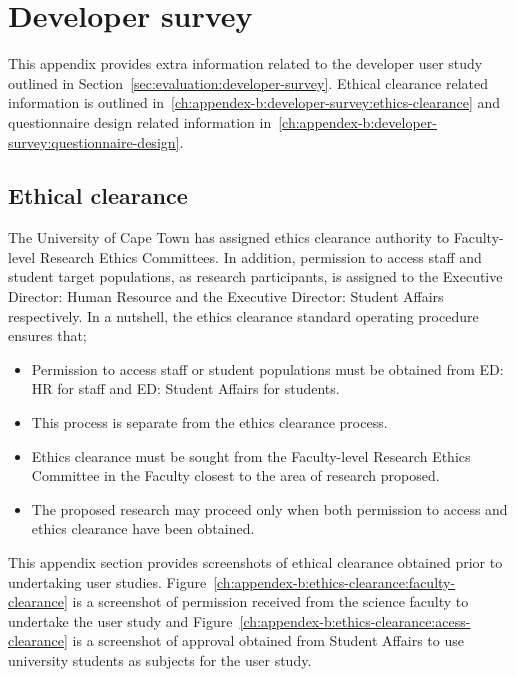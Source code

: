 \chapter[Developer survey]{Developer survey\label{ch:appendex-b:developer-survey}}

This appendix provides extra information related to the developer user study outlined in Section~\ref{sec:evaluation:developer-survey}. Ethical clearance related information is outlined in~\ref{ch:appendex-b:developer-survey:ethics-clearance} and questionnaire design related information in~\ref{ch:appendex-b:developer-survey:questionnaire-design}.

\section[Ethical clearance]{Ethical clearance \label{ch:appendex-b:developer-survey:ethics-clearance}}

The University of Cape Town has assigned ethics clearance authority to Faculty-level Research Ethics Committees. In addition, permission to access staff and student target populations, as research participants, is assigned to the Executive Director: Human Resource and the Executive Director: Student Affairs respectively. In a nutshell, the ethics clearance standard operating procedure ensures that;

\begin{itemize}
 \item Permission to access staff or student populations must be obtained from ED: HR for staff and ED: Student Affairs for students.
 \item This process is separate from the ethics clearance process.
 \item Ethics clearance must be sought from the Faculty-level Research Ethics Committee in the Faculty closest to the area of research proposed.
 \item The proposed research may proceed only when both permission to access and ethics clearance have been obtained.
\end{itemize}

This appendix section provides screenshots of ethical clearance obtained prior to undertaking user studies. Figure~\ref{ch:appendex-b:ethics-clearance:faculty-clearance} is a screenshot of permission received from the science faculty to undertake the user study and Figure~\ref{ch:appendex-b:ethics-clearance:acess-clearance} is a screenshot of approval obtained from Student Affairs to use university students as subjects for the user study.

